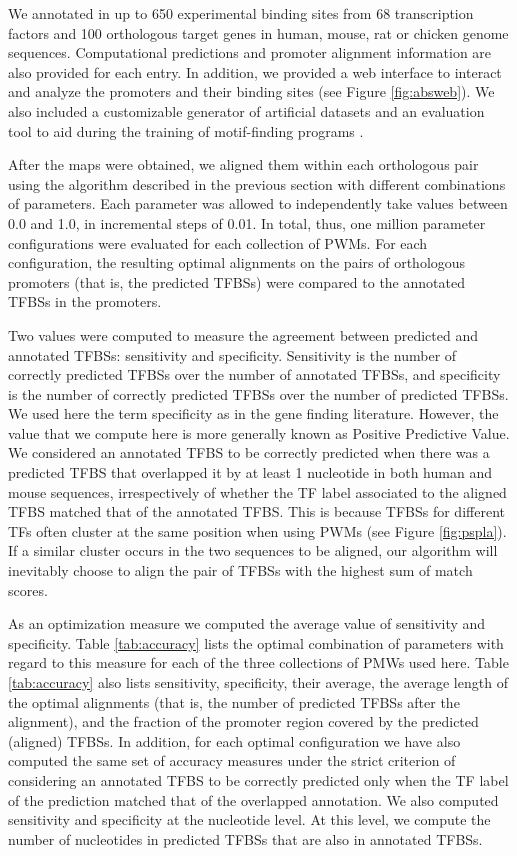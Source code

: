 We annotated in  \citep{blanco:2006a} up to 650 
experimental binding sites from 68 transcription factors and 100 orthologous target 
genes in human, mouse, rat or chicken genome sequences. Computational predictions 
and promoter alignment information are also provided for each entry. In addition, 
we provided a web interface to interact and analyze the promoters and their binding 
sites (see Figure \ref{fig:absweb}). We also included a customizable generator of artificial 
datasets and an evaluation tool to aid during the training of motif-finding programs 
\citep{blanco:2006a}.



After the maps were obtained, we aligned them within each orthologous
pair using the algorithm described in the previous section with
different combinations of parameters. Each parameter was allowed to
independently take values between 0.0 and 1.0, in incremental steps of
0.01.  In total, thus, one million parameter configurations were
evaluated for each collection of PWMs.  For each configuration,
the resulting optimal alignments on the pairs of orthologous promoters
(that is, the predicted TFBSs) were compared to the annotated TFBSs in
the promoters.

Two values were computed to measure the agreement between predicted
and annotated TFBSs: sensitivity and specificity. Sensitivity
is the number of correctly predicted TFBSs over the number of
annotated TFBSs, and specificity is the number of correctly predicted TFBSs
over the number of predicted TFBSs. We used here the term specificity as 
in the gene finding literature. However, the value that we compute here 
is more generally known as Positive Predictive Value. We considered an 
annotated TFBS to be correctly predicted when there was a predicted TFBS that 
overlapped it by at least 1 nucleotide in both human and mouse sequences,
irrespectively of whether the TF label associated to the aligned TFBS
matched that of the annotated TFBS. This is because TFBSs for different 
TFs often cluster at the same position when using PWMs (see Figure 
\ref{fig:pspla}). If a similar cluster occurs in the two sequences to be
aligned, our algorithm will inevitably choose to align the pair of
TFBSs with the highest sum of match scores.

As an optimization measure we computed the average value of sensitivity
and specificity. Table \ref{tab:accuracy} lists the optimal combination of 
parameters with regard to this measure for each of the three collections of 
PMWs used here. Table \ref{tab:accuracy} also lists sensitivity, specificity, their average, 
the average length of the optimal alignments (that is, the number of predicted 
TFBSs after the alignment), and the fraction of the promoter region covered by the
predicted (aligned) TFBSs. In addition, for each optimal configuration
we have also computed the same set of accuracy measures under the
strict criterion of considering an annotated TFBS to be correctly
predicted only when the TF label of the prediction matched that of the
overlapped annotation. We also computed sensitivity and specificity at 
the nucleotide level. At this level, we compute the number of nucleotides in
predicted TFBSs that are also in annotated TFBSs. 

